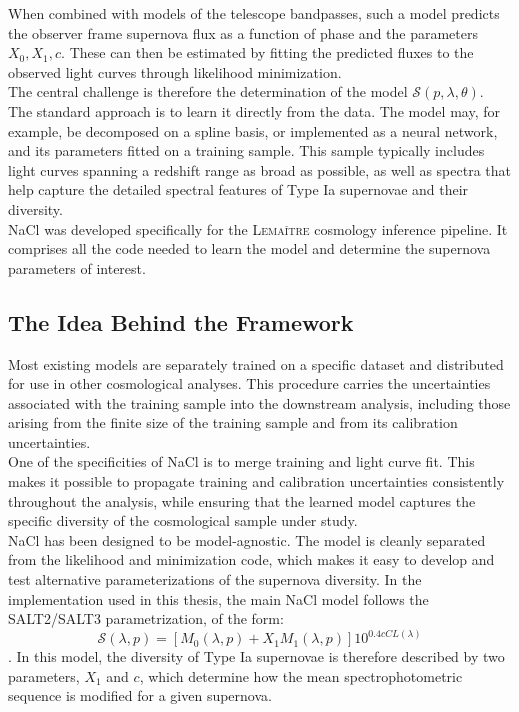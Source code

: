 When combined with models of the telescope bandpasses, such a model 
predicts the observer frame supernova flux as a function of phase and 
the parameters $X_0, X_1, c$. These can then be estimated by fitting 
the predicted fluxes to the observed light curves through likelihood 
minimization. \\

The central challenge is therefore the determination of the model 
$\mathcal{S}(p,\lambda,\theta)$. The standard approach is to learn it directly 
from the data. The model may, for example, be decomposed on a spline 
basis, or implemented as a neural network, and its parameters fitted 
on a training sample. This sample typically includes light curves 
spanning a redshift range as broad as possible, as well as spectra 
that help capture the detailed spectral features of Type Ia supernovae 
and their diversity. \\

NaCl was developed specifically for the \textsc{Lemaître} cosmology inference 
pipeline. It comprises all the code needed to learn the model and 
determine the supernova parameters of interest.

\subsection{The Idea Behind the Framework}

Most existing models are separately trained on a specific dataset and 
distributed for use in other cosmological analyses. This procedure 
carries the uncertainties associated with the training sample into the 
downstream analysis, including those arising from the finite size of 
the training sample and from its calibration uncertainties. \\

One of the specificities of NaCl is to merge training and light curve 
fit. This makes it possible to propagate training and calibration 
uncertainties consistently throughout the analysis, while ensuring 
that the learned model captures the specific diversity of the 
cosmological sample under study. \\

NaCl has been designed to be model-agnostic. The model is cleanly 
separated from the likelihood and minimization code, which makes it 
easy to develop and test alternative parameterizations of the 
supernova diversity. In the implementation used in this thesis, the main NaCl model follows the 
SALT2/SALT3 parametrization, of the form: $$ \mathcal{S}(\lambda,p) = [M_0(\lambda,p) + X_1M_1(\lambda, p)]10^{0.4cCL(\lambda)} $$. 
In this model, the diversity 
of Type Ia supernovae is therefore described by two parameters, $X_1$ 
and $c$, which determine how the mean spectrophotometric sequence is 
modified for a given supernova. \\

